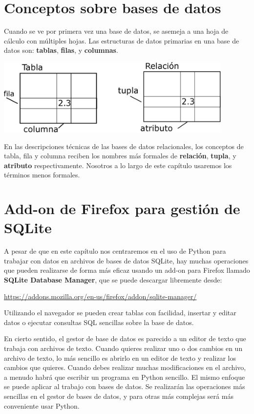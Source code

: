 \section{Conceptos sobre bases de datos}

Cuando se ve por primera vez una base de datos, se asemeja a una
hoja de cálculo con múltiples hojas. Las estructuras de datos primarias
en una base de datos son:
{\bf tablas}, {\bf filas}, y {\bf columnas}.  

\beforefig
\centerline{\includegraphics[height=1.50in]{figs2/relational.eps}}
\afterfig

En las descripciones técnicas de las bases de datos relacionales, los conceptos de
tabla, fila y columna reciben los nombres más formales
de {\bf relación}, {\bf tupla}, y {\bf atributo} respectivamente.
Nosotros a lo largo de este capítulo usaremos los términos menos formales.

\section{Add-on de Firefox para gestión de SQLite}

A pesar de que en este capítulo nos centraremos en el uso de Python para trabajar con datos
en archivos de bases de datos SQLite, hay muchas operaciones que pueden realizarse
de forma más eficaz usando un add-on para Firefox llamado {\bf SQLite
Database Manager}, que se puede descargar libremente desde:

\url{https://addons.mozilla.org/en-us/firefox/addon/sqlite-manager/}

Utilizando el navegador se pueden crear tablas con facilidad, insertar y editar datos
o ejecutar consultas SQL sencillas sobre la base de datos.

En cierto sentido, el gestor de base de datos es parecido a un editor de texto
que trabaja con archivos de texto. Cuando quieres realizar uno o
dos cambios en un archivo de texto, lo más sencillo es abrirlo en
un editor de texto y realizar los cambios que quieres. Cuando debes realizar
muchas modificaciones en el archivo, a menudo
habrá que escribir un programa en Python sencillo. El mismo enfoque
se puede aplicar al trabajo con bases de datos. Se realizarán las
operaciones más sencillas en el gestor de bases de datos, y para otras más complejas
será más conveniente usar Python.

